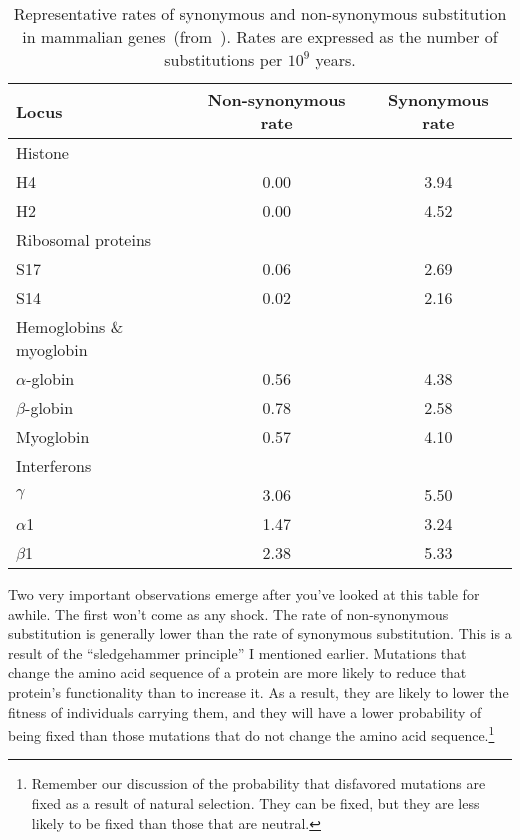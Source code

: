 \documentclass[12pt]{article}
\begin{document}
\begin{table}
\begin{center}
\begin{tabular}{lcc}
\hline\hline
Locus     & Non-synonymous rate & Synonymous rate \\
\hline
Histone \\
\quad H4  & 0.00                & 3.94 \\
\quad H2  & 0.00                & 4.52 \\
Ribosomal proteins \\
\quad S17 & 0.06                & 2.69 \\
\quad S14 & 0.02                & 2.16 \\
Hemoglobins \& myoglobin \\
\quad $\alpha$-globin & 0.56    & 4.38 \\
\quad $\beta$-globin  & 0.78    & 2.58 \\
\quad Myoglobin       & 0.57    & 4.10 \\
Interferons \\
\quad $\gamma$  & 3.06          & 5.50 \\
\quad $\alpha$1 & 1.47          & 3.24 \\
\quad $\beta$1  & 2.38          & 5.33 \\
\hline
\end{tabular}
\end{center}
\caption{Representative rates of synonymous and non-synonymous
  substitution in mammalian genes~(from~\cite{Li97}). Rates are
  expressed as the number of substitutions per $10^9$
  years.}\label{table:substitution-data}
\end{table}

Two very important observations emerge after you've looked at this
table for awhile. The first won't come as any shock. The rate of
non-synonymous substitution is generally lower than the rate of
synonymous substitution. This is a result of the ``sledgehammer
principle'' I mentioned earlier. Mutations that change the amino acid
sequence of a protein are more likely to reduce that protein's
functionality than to increase it. As a result, they are likely to
lower the fitness of individuals carrying them, and they will have a
lower probability of being fixed than those mutations that do not
change the amino acid sequence.\footnote{Remember our discussion of the probability that
  disfavored mutations are fixed as a result of natural
  selection. They can be fixed, but they are less likely to be fixed
  than those that are neutral.}
  
\end{document}
